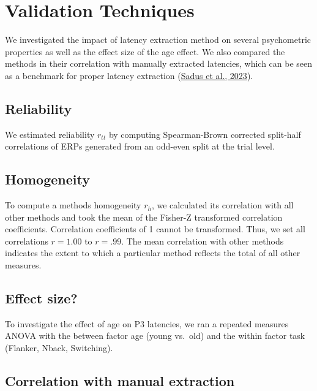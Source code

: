 \documentclass[
  man,floatsintext]{apa7}
\begin{document}
\hypertarget{validation-techniques}{%
\section{Validation Techniques}\label{validation-techniques}}

We investigated the impact of latency extraction method on several psychometric properties as well as the effect size of the age effect. We also compared the methods in their correlation with manually extracted latencies, which can be seen as a benchmark for proper latency extraction (\protect\hyperlink{ref-sadus2023multiverse}{Sadus et al., 2023}).

\hypertarget{reliability}{%
\subsection{Reliability}\label{reliability}}

We estimated reliability \(r_{tt}\) by computing Spearman-Brown corrected split-half correlations of ERPs generated from an odd-even split at the trial level.

\hypertarget{homogeneity}{%
\subsection{Homogeneity}\label{homogeneity}}

To compute a methods homogeneity \(r_h\), we calculated its correlation with all other methods and took the mean of the Fisher-Z transformed correlation coefficients. Correlation coefficients of 1 cannot be transformed. Thus, we set all correlations \(r = 1.00\) to \(r = .99\). The mean correlation with other methods indicates the extent to which a particular method reflects the total of all other measures.

\hypertarget{effect-size}{%
\subsection{Effect size?}\label{effect-size}}

To investigate the effect of age on P3 latencies, we ran a repeated measures ANOVA with the between factor age (young vs.~old) and the within factor task (Flanker, Nback, Switching).

\hypertarget{correlation-with-manual-extraction}{%
\subsection{Correlation with manual extraction}\label{correlation-with-manual-extraction}}
\end{document}
